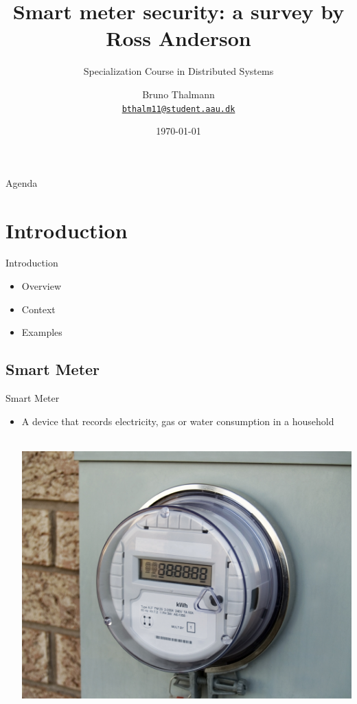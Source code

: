 \documentclass[10pt]{beamer}
\title{Smart meter security: a survey by Ross Anderson}
\subtitle{Specialization Course in Distributed Systems}  %
\date{\today}
\author{
  Bruno Thalmann\\
  \href{mailto:bthalm11@student.aau.dk}{{\tt bthalm11@student.aau.dk}}
}
\institute[
  Dept.\ of Computer Science\\
  Aalborg University\\
  Denmark
] %
{%
  Department of Computer Science\\
  Aalborg University\\
  Denmark
  
}
\begin{document}
{\aauwavesbg%
\begin{frame} %
  \titlepage
\end{frame}}

\begin{frame}{Agenda}{}
\tableofcontents
\end{frame}

\section{Introduction}
\begin{frame}{Introduction}{}
	\begin{itemize}
		\item Overview
		
		\hfil
		\item Context
		
		\hfil
		\item Examples
	\end{itemize}
\end{frame}

\subsection{Smart Meter}
\begin{frame}{Smart Meter}
\begin{itemize}
\item A device that records electricity, gas or water consumption in a household
\\~\\
\begin{center}
\includegraphics[scale=.25]{./graphics/smart_meter}
\end{center}
\end{itemize}
\end{frame}
\end{document}
